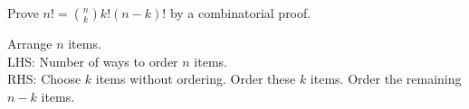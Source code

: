 \question Prove $n! = \binom{n}{k}k!(n - k)!$ by a combinatorial proof. \\

\begin{solution}[2 cm]
Arrange $n$ items. \\
LHS: Number of ways to order $n$ items. \\
RHS: Choose $k$ items without ordering. Order these $k$ items. 
Order the remaining $n - k$ items.
\end{solution}